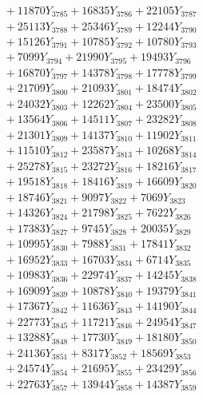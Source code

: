 \documentclass[a4paper,10pt]{article}
\begin{document}
{\begin{align}
&\;  + 11870 Y_{3785} + 16835 Y_{3786} + 22105 Y_{3787} \\[0.3ex]
&\;  + 25113 Y_{3788} + 25346 Y_{3789} + 12244 Y_{3790} \\[0.3ex]
&\;  + 15126 Y_{3791} + 10785 Y_{3792} + 10780 Y_{3793} \\[0.3ex]
&\;  + 7099 Y_{3794} + 21990 Y_{3795} + 19493 Y_{3796} \\[0.3ex]
&\;  + 16870 Y_{3797} + 14378 Y_{3798} + 17778 Y_{3799} \\[0.3ex]
&\;  + 21709 Y_{3800} + 21093 Y_{3801} + 18474 Y_{3802} \\[0.3ex]
&\;  + 24032 Y_{3803} + 12262 Y_{3804} + 23500 Y_{3805} \\[0.3ex]
&\;  + 13564 Y_{3806} + 14511 Y_{3807} + 23282 Y_{3808} \\[0.5ex]\allowbreak
&\;  + 21301 Y_{3809} + 14137 Y_{3810} + 11902 Y_{3811} \\[0.3ex]
&\;  + 11510 Y_{3812} + 23587 Y_{3813} + 10268 Y_{3814} \\[0.3ex]
&\;  + 25278 Y_{3815} + 23272 Y_{3816} + 18216 Y_{3817} \\[0.3ex]
&\;  + 19518 Y_{3818} + 18416 Y_{3819} + 16609 Y_{3820} \\[0.3ex]
&\;  + 18746 Y_{3821} + 9097 Y_{3822} + 7069 Y_{3823} \\[0.3ex]
&\;  + 14326 Y_{3824} + 21798 Y_{3825} + 7622 Y_{3826} \\[0.3ex]
&\;  + 17383 Y_{3827} + 9745 Y_{3828} + 20035 Y_{3829} \\[0.3ex]
&\;  + 10995 Y_{3830} + 7988 Y_{3831} + 17841 Y_{3832} \\[0.3ex]
&\;  + 16952 Y_{3833} + 16703 Y_{3834} + 6714 Y_{3835} \\[0.3ex]
&\;  + 10983 Y_{3836} + 22974 Y_{3837} + 14245 Y_{3838} \\[0.5ex]\allowbreak
&\;  + 16909 Y_{3839} + 10878 Y_{3840} + 19379 Y_{3841} \\[0.3ex]
&\;  + 17367 Y_{3842} + 11636 Y_{3843} + 14190 Y_{3844} \\[0.3ex]
&\;  + 22773 Y_{3845} + 11721 Y_{3846} + 24954 Y_{3847} \\[0.3ex]
&\;  + 13288 Y_{3848} + 17730 Y_{3849} + 18180 Y_{3850} \\[0.3ex]
&\;  + 24136 Y_{3851} + 8317 Y_{3852} + 18569 Y_{3853} \\[0.3ex]
&\;  + 24574 Y_{3854} + 21695 Y_{3855} + 23429 Y_{3856} \\[0.3ex]
&\;  + 22763 Y_{3857} + 13944 Y_{3858} + 14387 Y_{3859} \\[0.3ex]

\end{align}}
\end{document}
